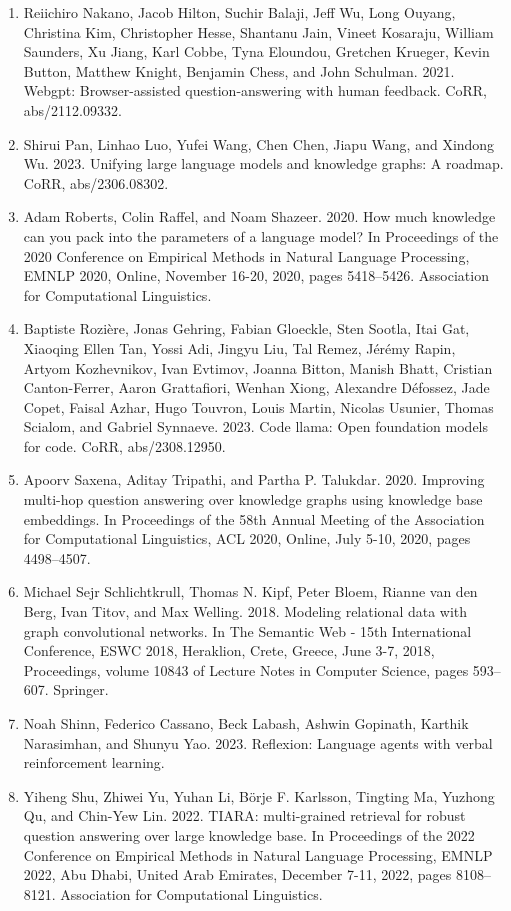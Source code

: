 \documentclass[11pt,UTF8,fontset=fandol]{ctexart}
\begin{document}
\begin{enumerate}[leftmargin=2em]
\item Reiichiro Nakano, Jacob Hilton, Suchir Balaji, Jeff Wu, Long Ouyang, Christina Kim, Christopher Hesse, Shantanu Jain, Vineet Kosaraju, William Saunders, Xu Jiang, Karl Cobbe, Tyna Eloundou, Gretchen Krueger, Kevin Button, Matthew Knight, Benjamin Chess, and John Schulman. 2021. Webgpt: Browser-assisted question-answering with human feedback. CoRR, abs/2112.09332.
\item Shirui Pan, Linhao Luo, Yufei Wang, Chen Chen, Jiapu Wang, and Xindong Wu. 2023. Unifying large language models and knowledge graphs: A roadmap. CoRR, abs/2306.08302.
\item Adam Roberts, Colin Raffel, and Noam Shazeer. 2020. How much knowledge can you pack into the parameters of a language model? In Proceedings of the 2020 Conference on Empirical Methods in Natural Language Processing, EMNLP 2020, Online, November 16-20, 2020, pages 5418--5426. Association for Computational Linguistics.
\item Baptiste Rozière, Jonas Gehring, Fabian Gloeckle, Sten Sootla, Itai Gat, Xiaoqing Ellen Tan, Yossi Adi, Jingyu Liu, Tal Remez, Jérémy Rapin, Artyom Kozhevnikov, Ivan Evtimov, Joanna Bitton, Manish Bhatt, Cristian Canton-Ferrer, Aaron Grattafiori, Wenhan Xiong, Alexandre Défossez, Jade Copet, Faisal Azhar, Hugo Touvron, Louis Martin, Nicolas Usunier, Thomas Scialom, and Gabriel Synnaeve. 2023. Code llama: Open foundation models for code. CoRR, abs/2308.12950.
\item Apoorv Saxena, Aditay Tripathi, and Partha P. Talukdar. 2020. Improving multi-hop question answering over knowledge graphs using knowledge base embeddings. In Proceedings of the 58th Annual Meeting of the Association for Computational Linguistics, ACL 2020, Online, July 5-10, 2020, pages 4498--4507.
\item Michael Sejr Schlichtkrull, Thomas N. Kipf, Peter Bloem, Rianne van den Berg, Ivan Titov, and Max Welling. 2018. Modeling relational data with graph convolutional networks. In The Semantic Web - 15th International Conference, ESWC 2018, Heraklion, Crete, Greece, June 3-7, 2018, Proceedings, volume 10843 of Lecture Notes in Computer Science, pages 593--607. Springer.
\item Noah Shinn, Federico Cassano, Beck Labash, Ashwin Gopinath, Karthik Narasimhan, and Shunyu Yao. 2023. Reflexion: Language agents with verbal reinforcement learning.
\item Yiheng Shu, Zhiwei Yu, Yuhan Li, Börje F. Karlsson, Tingting Ma, Yuzhong Qu, and Chin-Yew Lin. 2022. TIARA: multi-grained retrieval for robust question answering over large knowledge base. In Proceedings of the 2022 Conference on Empirical Methods in Natural Language Processing, EMNLP 2022, Abu Dhabi, United Arab Emirates, December 7-11, 2022, pages 8108--8121. Association for Computational Linguistics.

\end{enumerate}
\end{document}
